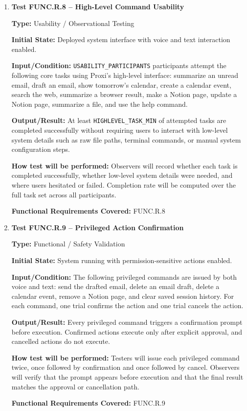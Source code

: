 \documentclass[12pt, titlepage]{article}
\begin{document}
\begin{enumerate}

\item \textbf{Test FUNC.R.8 -- High-Level Command Usability}

\textbf{Type:} Usability / Observational Testing

\textbf{Initial State:} Deployed system interface with voice and text
interaction enabled.

\textbf{Input/Condition:} \texttt{USABILITY\_PARTICIPANTS} participants
attempt the following core tasks using Proxi's high-level interface:
summarize an unread email, draft an email, show tomorrow's calendar,
create a calendar event, search the web, summarize a browser result,
make a Notion page, update a Notion page, summarize a file, and use the
help command.

\textbf{Output/Result:} At least \texttt{HIGHLEVEL\_TASK\_MIN} of
attempted tasks are completed successfully without requiring users to
interact with low-level system details such as raw file paths, terminal
commands, or manual system configuration steps.

\textbf{How test will be performed:} Observers will record whether each
task is completed successfully, whether low-level system details were
needed, and where users hesitated or failed. Completion rate will be
computed over the full task set across all participants.

\textbf{Functional Requirements Covered:} FUNC.R.8

\item \textbf{Test FUNC.R.9 -- Privileged Action Confirmation}

\textbf{Type:} Functional / Safety Validation

\textbf{Initial State:} System running with permission-sensitive actions
enabled.

\textbf{Input/Condition:} The following privileged commands are issued by
both voice and text: send the drafted email, delete an email draft,
delete a calendar event, remove a Notion page, and clear saved session
history. For each command, one trial confirms the action and one trial
cancels the action.

\textbf{Output/Result:} Every privileged command triggers a confirmation
prompt before execution. Confirmed actions execute only after explicit
approval, and cancelled actions do not execute.

\textbf{How test will be performed:} Testers will issue each privileged
command twice, once followed by confirmation and once followed by
cancel. Observers will verify that the prompt appears before execution
and that the final result matches the approval or cancellation path.

\textbf{Functional Requirements Covered:} FUNC.R.9

\end{enumerate}
\end{document}
